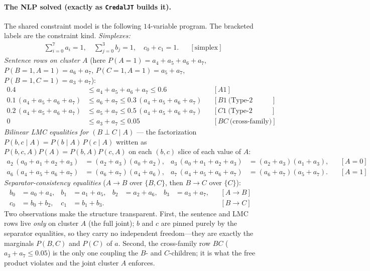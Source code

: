 \documentclass[11pt]{article}
\begin{document}
\paragraph{The NLP solved (exactly as \texttt{CredalJT} builds it).} The shared
constraint model is the following $14$-variable program. The bracketed labels are the
constraint kind. \emph{Simplexes:}
\begin{align*}
&\textstyle\sum_{i=0}^{7} a_i = 1, \quad \sum_{j=0}^{3} b_j = 1, \quad c_0 + c_1 = 1.
&&[\text{simplex}]
\end{align*}
\emph{Sentence rows on cluster $A$} (here $P(A{=}1)=a_4{+}a_5{+}a_6{+}a_7$,
$P(B{=}1,A{=}1)=a_6{+}a_7$, $P(C{=}1,A{=}1)=a_5{+}a_7$, $P(B{=}1,C{=}1)=a_3{+}a_7$):
\begin{align*}
  0.4 &\le a_4+a_5+a_6+a_7 \le 0.6 &&[\mathit{A1}]\\
  0.1\,(a_4{+}a_5{+}a_6{+}a_7) &\le a_6+a_7 \le 0.3\,(a_4{+}a_5{+}a_6{+}a_7) &&[\mathit{B1}\ \text{(Type-2 ratio)}]\\
  0.2\,(a_4{+}a_5{+}a_6{+}a_7) &\le a_5+a_7 \le 0.5\,(a_4{+}a_5{+}a_6{+}a_7) &&[\mathit{C1}\ \text{(Type-2 ratio)}]\\
  0 &\le a_3+a_7 \le 0.05 &&[\mathit{BC}\ \text{(cross-family)}]
\end{align*}
\emph{Bilinear LMC equalities for $(B\perp C\mid A)$} --- the factorization
$P(b,c\mid A)=P(b\mid A)\,P(c\mid A)$ written as $P(b,c,A)P(A)=P(b,A)P(c,A)$ on each
$(b,c)$ slice of each value of $A$:
\begin{align*}
  a_2\,(a_0{+}a_1{+}a_2{+}a_3) &= (a_2{+}a_3)(a_0{+}a_2), &
  a_3\,(a_0{+}a_1{+}a_2{+}a_3) &= (a_2{+}a_3)(a_1{+}a_3), &&[A{=}0]\\
  a_6\,(a_4{+}a_5{+}a_6{+}a_7) &= (a_6{+}a_7)(a_4{+}a_6), &
  a_7\,(a_4{+}a_5{+}a_6{+}a_7) &= (a_6{+}a_7)(a_5{+}a_7). &&[A{=}1]
\end{align*}
\emph{Separator-consistency equalities} ($A\to B$ over $\{B,C\}$, then $B\to C$ over $\{C\}$):
\begin{align*}
  b_0 &= a_0+a_4, & b_1 &= a_1+a_5, & b_2 &= a_2+a_6, & b_3 &= a_3+a_7,
  &&[A\!\to\!B]\\
  c_0 &= b_0+b_2, & c_1 &= b_1+b_3. &&&&&&[B\!\to\!C]
\end{align*}
Two observations make the structure transparent. First, the sentence and LMC rows live
\emph{only} on cluster $A$ (the full joint); $b$ and $c$ are pinned purely by the separator
equalities, so they carry no independent freedom---they are exactly the marginals
$P(B,C)$ and $P(C)$ of $a$. Second, the cross-family row $\mathit{BC}$ ($a_3{+}a_7\le0.05$)
is the only one coupling the $B$- and $C$-children; it is what the free product violates and
the joint cluster $A$ enforces.
\end{document}
